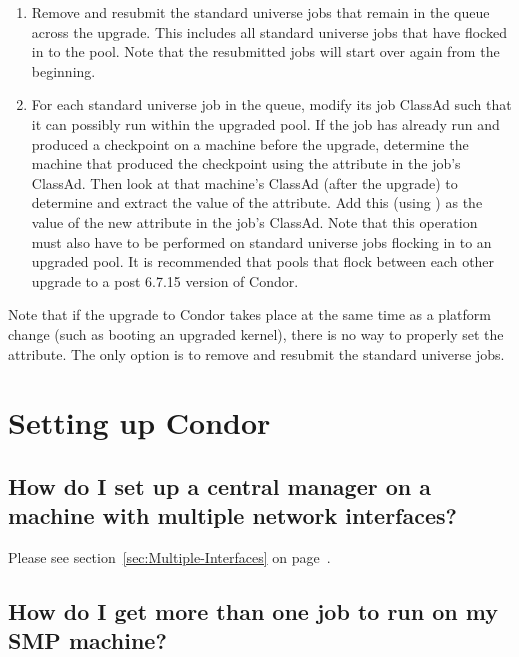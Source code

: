 \begin{enumerate}
  \item Remove and resubmit the standard universe jobs that
  remain in the queue across the upgrade. 
  This includes all standard universe jobs that have flocked in to 
  the pool.
  Note that the resubmitted jobs will start over again from the beginning.

  \item For each standard universe job in the queue,
  modify its job ClassAd such that it can possibly run within the
  upgraded pool.
  If the job has already run and produced a checkpoint on a machine
  before the upgrade, determine the machine that produced the checkpoint
  using the  attribute
  in the job's ClassAd.
  Then look at that machine's ClassAd (after the upgrade) to
  determine and extract the value of the  attribute.
  Add this (using ) as the value of the 
  new attribute  in the job's ClassAd.
  Note that this operation must also have to be performed on standard
  universe jobs flocking in to an upgraded pool. 
  It is recommended that pools that flock between each other upgrade to a
  post 6.7.15 version of Condor.
\end{enumerate}

Note that if the upgrade to Condor takes place at the same time
as a platform change (such as booting an upgraded kernel),
there is no way to properly set the  attribute.
The only option is to remove and resubmit the standard universe jobs.

\section{Setting up Condor}

\subsection*{How do I set up a central manager on a machine with multiple network interfaces?}

Please see section~\ref{sec:Multiple-Interfaces} on 
page~\pageref{sec:Multiple-Interfaces}.

\subsection*{How do I get more than one job to run on my SMP machine?}

